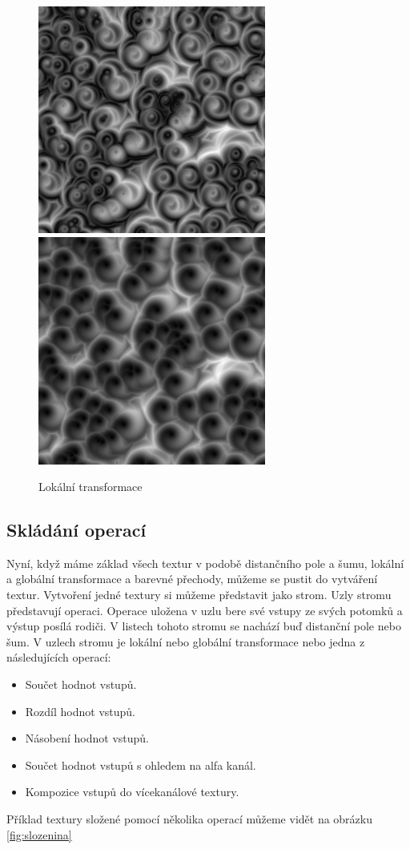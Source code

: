 \begin{figure}[h]
\centering
\includegraphics[width=7.5cm,keepaspectratio]{obr/voro_00.jpg}
\includegraphics[width=7.5cm,keepaspectratio]{obr/voro_01.jpg}
\caption{Lokální transformace}
\label{fig:voropopis}
\end{figure}


\subsection{Skládání operací}
Nyní, když máme základ všech textur v podobě distančního pole a šumu, lokální a globální transformace a barevné přechody, můžeme se pustit do vytváření textur.
Vytvoření jedné textury si můžeme představit jako strom.
Uzly stromu představují operaci.
Operace uložena v uzlu bere své vstupy ze svých potomků a výstup posílá rodiči.
V listech tohoto stromu se nachází buď distanční pole nebo šum.
V uzlech stromu je lokální nebo globální transformace nebo jedna z následujících operací:
\begin{itemize}
\item
Součet hodnot vstupů.
\item
Rozdíl hodnot vstupů.
\item
Násobení hodnot vstupů.
\item
Součet hodnot vstupů s ohledem na alfa kanál.
\item
Kompozice vstupů do vícekanálové textury.
\end{itemize}
Příklad textury složené pomocí několika operací můžeme vidět na obrázku \ref{fig:slozenina}

